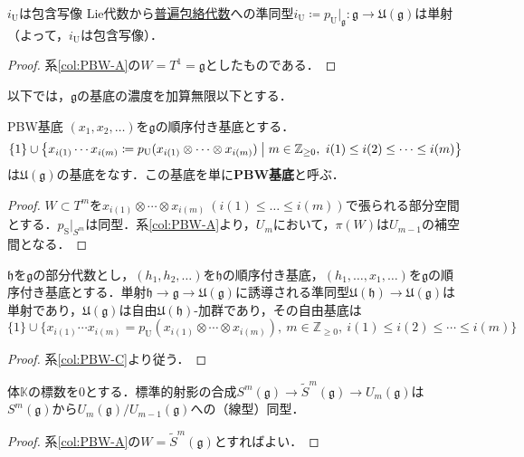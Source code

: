 \documentclass[rep_main]{subfiles}
\begin{document}
\begin{mycol}[label=col:PBW-B]{$i_\text{U}$は包含写像}
	Lie代数から\hyperref[def:univ-env-alg]{普遍包絡代数}への準同型$i_\text{U} \coloneqq p_\text{U}|_\mathfrak{g}: \mathfrak{g} \to \mathfrak{U}(\mathfrak{g})$は単射（よって，$i_\text{U}$は包含写像）．
\end{mycol}
\begin{proof}
	系\ref{col:PBW-A}の$W = T^1  = \mathfrak{g}$としたものである．
\end{proof}
以下では，$\mathfrak{g}$の基底の濃度を加算無限以下とする．
\begin{mycol}[label=col:PBW-C]{PBW基底}
	$(x_1, x_2, \ldots)$を$\mathfrak{g}$の順序付き基底とする．
	\begin{equation}
		\{1\} \cup \bigl\{x_{i(1)}\cdots x_{i(m)} \coloneqq p_\text{U}(x_{i(1)} \otimes \cdots \otimes x_{i(m)}) \bigm| m \in \mathbb{Z}_{\geq 0},\ i(1) \leq i(2) \leq \cdots \leq i(m) \bigr\}
	\end{equation}
	は$\mathfrak{U}(\mathfrak{g})$の基底をなす．この基底を単に\textbf{PBW基底}と呼ぶ．
\end{mycol}
\begin{proof}
	$W \subset T^m$を$x_{i(1)}\otimes\cdots\otimes x_{i(m)}\ (i(1) \leq \ldots \leq i(m))$で張られる部分空間とする．$p_\text{S}|_{S^m}$は同型．系\ref{col:PBW-A}より，$U_m$において，$\pi(W)$は$U_{m-1}$の補空間となる．
\end{proof}
\begin{mycol}[label=col:PBW-D]{}
	$\mathfrak{h}$を$\mathfrak{g}$の部分代数とし，$(h_1, h_2, \ldots)$を$\mathfrak{h}$の順序付き基底，$(h_1, \ldots, x_1, \ldots)$を$\mathfrak{g}$の順序付き基底とする．単射$\mathfrak{h} \to \mathfrak{g} \to \mathfrak{U}(\mathfrak{g})$に誘導される準同型$\mathfrak{U}(\mathfrak{h}) \to \mathfrak{U}(\mathfrak{g})$は単射であり，$\mathfrak{U}(\mathfrak{g})$は自由$\mathfrak{U}(\mathfrak{h})$-加群であり，その自由基底は
	\begin{equation}
		\{1\} \cup \bigl\{x_{i(1)}\cdots x_{i(m)} = p_\text{U}(x_{i(1)} \otimes \cdots \otimes x_{i(m)}),\ m \in \mathbb{Z}_{\geq 0},\ i(1) \leq i(2) \leq \cdots \leq i(m)\bigr\}
	\end{equation}
\end{mycol}
\begin{proof}
	系\ref{col:PBW-C}より従う．
\end{proof}
\begin{mycol}[label=col:PBW-E]{}
	体$\mathbb{K}$の標数を$0$とする．標準的射影の合成$S^m(\mathfrak{g}) \to \tilde{S}^m(\mathfrak{g}) \to U_m(\mathfrak{g})$は$S^m(\mathfrak{g})$から$U_m(\mathfrak{g}) / U_{m-1}(\mathfrak{g})$への（線型）同型．
\end{mycol}
\begin{proof}
	系\ref{col:PBW-A}の$W = \tilde{S}^m(\mathfrak{g})$とすればよい．
\end{proof}
\end{document}
